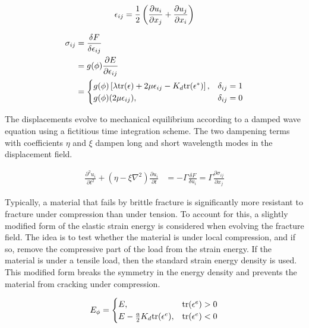 \begin{align} \label{eq:strain}
\epsilon_{ij} = \frac{1}{2}\left( \frac{\partial u_i}{\partial x_j} + \frac{\partial u_j}{\partial x_i}\right) 
\end{align}

\begin{align}
\sigma_{ij} &= \frac{\delta F}{\delta \epsilon_{ij}} \notag\\
&= g(\phi)\frac{\partial E}{\partial \epsilon_{ij}}\label{eq:stress}\\
 &= 
\begin{cases}
g(\phi)\left[\lambda\text{tr}(\epsilon) + 2\mu \epsilon_{ij} - K_d\text{tr}(\epsilon^*)\right], &\delta_{ij}=1 \\
g(\phi)(2\mu\epsilon_{ij}), & \delta_{ij}=0	\notag
\end{cases}	
\end{align}

The displacements evolve to mechanical equilibrium according to a damped wave equation using a fictitious time integration scheme. The two dampening terms with coefficients $\eta$ and $\xi$ dampen long and short wavelength modes in the displacement field. 

\begin{align}
\frac{\partial^2 u_i}{\partial t^2} + (\eta - \xi \nabla^2) \frac{\partial u_i}{\partial t} &= - \Gamma \frac{\delta F}{\delta u_i} = \Gamma \frac{\partial \sigma_{ij}}{\partial x_j}
\end{align}

Typically, a material that fails by brittle fracture is significantly more resistant to fracture under compression than under tension. To account for this, a slightly modified form of the elastic strain energy is considered when evolving the fracture field. The idea is to test whether the material is under local compression, and if so, remove the compressive part of the load from the strain energy. If the material is under a tensile load, then the standard strain energy density is used. This modified form breaks the symmetry in the energy density and prevents the material from cracking under compression. 

\begin{align}\label{eq:modified_strain_energy_density}
	E_{\phi} = 
	\begin{cases}
	E, & \text{tr}(\epsilon^e) > 0 \\
	E - \frac{a}{2} K_d \text{tr}(\epsilon^e), & \text{tr}(\epsilon^e) < 0	
	\end{cases}
\end{align}


